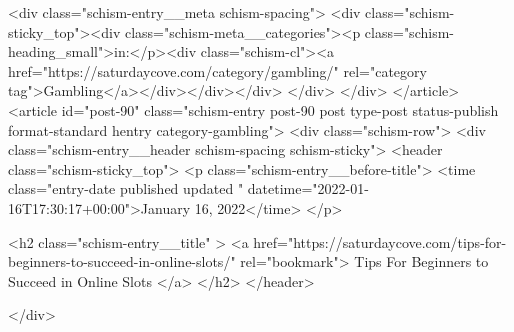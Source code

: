 {		<div class="schism-entry__meta schism-spacing">			<div class="schism-sticky_top"><div class="schism-meta__categories"><p class="schism-heading_small">in:</p><div class="schism-cl"><a href="https://saturdaycove.com/category/gambling/" rel="category tag">Gambling</a></div></div></div>		</div>
	</div>
</article>
<article id="post-90" class="schism-entry post-90 post type-post status-publish format-standard hentry category-gambling">
	<div class="schism-row">		<div class="schism-entry__header schism-spacing schism-sticky">			<header class="schism-sticky_top">				<p class="schism-entry__before-title">
					<time class="entry-date published updated " datetime="2022-01-16T17:30:17+00:00">January 16, 2022</time>				</p>

				<h2 class="schism-entry__title" >
					<a href="https://saturdaycove.com/tips-for-beginners-to-succeed-in-online-slots/" rel="bookmark">
						Tips For Beginners to Succeed in Online Slots					</a>
				</h2>
			</header>

					</div>

}
